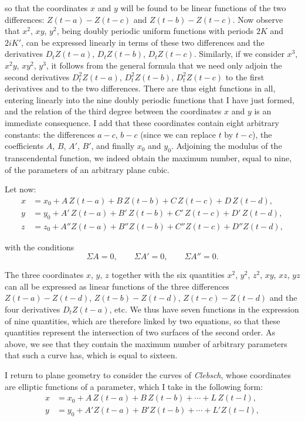 \documentclass[12pt]{article}
\begin{document}
\noindent so that the coordinates $x$ and $y$ will be found to be linear functions of the two differences: $Z(t-a) - Z(t-c)$ and $Z(t-b) - Z(t-c)$. 
Now observe that $x^2$, $xy$, $y^2$, being doubly periodic uniform functions with periods $2K$ and $2iK'$, can be expressed linearly in terms of these two differences and the derivatives $D_t Z(t-a)$, $D_t Z(t-b)$, $D_t Z(t-c)$. 
Similarly, if we consider $x^3$, $x^2 y$, $xy^2$, $y^3$, it follows from the general formula that we need only adjoin the second derivatives $D_t^2 Z(t-a)$, $D_t^2 Z(t-b)$, $D_t^2 Z(t-c)$ to the first derivatives and to the
two differences. There are thus eight functions in all, entering linearly into the nine doubly periodic functions that I have just formed, and the relation of the third degree between the coordinates $x$ and $y$ is an immediate consequence. 
I add that these coordinates contain eight arbitrary constants: the differences $a-c$, $b-c$ (since we can replace $t$ by $t-c$), the coefficients $A$, $B$, $A'$, $B'$, and finally $x_0$ and $y_0$. Adjoining the modulus of the transcendental function, we indeed obtain the maximum number, equal to nine, of the parameters of an arbitrary plane cubic.

Let now:
\begin{align*}
x &= x_0 + A\,Z(t-a) + B\,Z(t-b) + C\,Z(t-c) + D\,Z(t-d),\\
y &= y_0 + A'\,Z(t-a) + B'\,Z(t-b) + C'\,Z(t-c) + D'\,Z(t-d),\\
z &= z_0 + A''\!Z(t-a) + B''\!Z(t-b) + C''\!Z(t-c) + D''\!Z(t-d),
\end{align*}

\noindent with the conditions
\begin{equation*}
\Sigma A = 0, \qquad \Sigma A' = 0, \qquad \Sigma A'' = 0.
\end{equation*}

\noindent The three coordinates $x$, $y$, $z$ together with the six quantities $x^2$, $y^2$, $z^2$, $xy$, $xz$, $yz$ can all be expressed as linear functions of the three differences $Z(t-a)-Z(t-d)$, $Z(t-b)-Z(t-d)$, $Z(t-c)-Z(t-d)$ and the four derivatives $D_t Z(t-a)$, etc. We thus have seven functions in the expression of nine quantities, which are therefore linked by two equations, so that these quantities represent the intersection of two surfaces of the second order. As above, we see that they contain the maximum number of arbitrary parameters that such a curve has, which is equal to sixteen.

I return to plane geometry to consider the curves of \textit{Clebsch}, whose coordinates are elliptic functions of a parameter, which I take in the following form:
\begin{align*}
x &= x_0 + A\,Z(t-a) + B\,Z(t-b) + \cdots + L\,Z(t-l),\\
y &= y_0 + A'Z(t-a) + B'Z(t-b) + \cdots + L'Z(t-l),
\end{align*}
\end{document}
